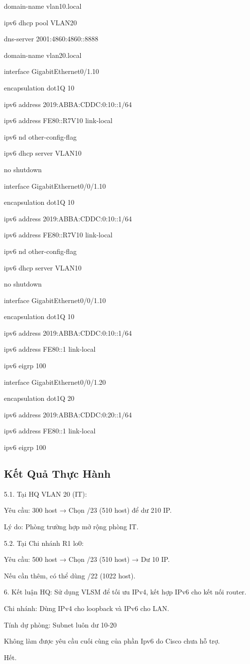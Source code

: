 \documentclass[13pt]{article}
\begin{document}
 domain-name vlan10.local

ipv6 dhcp pool VLAN20

 dns-server 2001:4860:4860::8888
 
 domain-name vlan20.local

interface GigabitEthernet0/1.10

 encapsulation dot1Q 10
 
 ipv6 address 2019:ABBA:CDDC:0:10::1/64
 
 ipv6 address FE80::R7V10 link-local
 
 ipv6 nd other-config-flag
 
 ipv6 dhcp server VLAN10
 
 no shutdown

interface GigabitEthernet0/0/1.10

 encapsulation dot1Q 10
 
 ipv6 address 2019:ABBA:CDDC:0:10::1/64
 
 ipv6 address FE80::R7V10 link-local
 
 ipv6 nd other-config-flag
 
 ipv6 dhcp server VLAN10
 
 no shutdown


interface GigabitEthernet0/0/1.10

 encapsulation dot1Q 10
 
 ipv6 address 2019:ABBA:CDDC:0:10::1/64
 
 ipv6 address FE80::1 link-local
 
 ipv6 eigrp 100

interface GigabitEthernet0/0/1.20

 encapsulation dot1Q 20
 
 ipv6 address 2019:ABBA:CDDC:0:20::1/64
 
 ipv6 address FE80::1 link-local
 
 ipv6 eigrp 100



    
\newpage
\subsection{Kết Quả Thực Hành}
5.1. Tại HQ
VLAN 20 (IT):

Yêu cầu: 300 host → Chọn /23 (510 host) để dư 210 IP.

Lý do: Phòng trường hợp mở rộng phòng IT.

5.2. Tại Chi nhánh
R1 lo0:

Yêu cầu: 500 host → Chọn /23 (510 host) → Dư 10 IP.

Nếu cần thêm, có thể dùng /22 (1022 host).

6. Kết luận
HQ: Sử dụng VLSM để tối ưu IPv4, kết hợp IPv6 cho kết nối router.

Chi nhánh: Dùng IPv4 cho loopback và IPv6 cho LAN.

Tính dự phòng: Subnet luôn dư 10-20

Không làm được yêu cầu cuối cùng của phần Ipv6 do Cisco chưa hỗ trợ.


Hết.\centering
\end{document}
